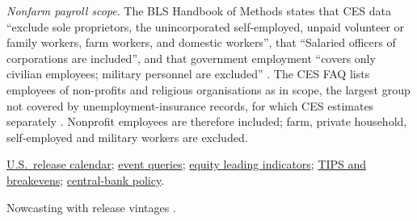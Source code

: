 \begin{qfdefinition}
\emph{Nonfarm payroll scope}. The BLS Handbook of Methods states that CES data ``exclude sole proprietors, the unincorporated self-employed, unpaid volunteer or family workers, farm workers, and domestic workers'', that ``Salaried officers of corporations are included'', and that government employment ``covers only civilian employees; military personnel are excluded'' \citep[CES concepts, page modified 28 February 2025]{bls-hom-ces}. The CES FAQ lists employees of non-profits and religious organisations as in scope, the largest group not covered by unemployment-insurance records, for which CES estimates separately \citep[Employment Concepts, Q4 and~Q6]{bls-ces-faq}. Nonprofit employees are therefore included; farm, private household, self-employed and military workers are excluded.

 \hyperref[data:us-macro-release-calendar]{U.S.\ release calendar}; \hyperref[meth:macro-event-queries]{event queries}; \hyperref[meth:equity-macro-leading-indicators]{equity leading indicators}; \hyperref[def:tips-breakevens]{TIPS and breakevens}; \hyperref[def:central-bank-policy-framework]{central-bank policy}.

 Nowcasting with release vintages \citep{wide-giannone-nowcasting}.

\end{qfdefinition}

